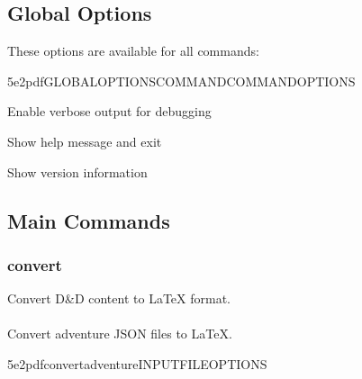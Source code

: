 \documentclass[letterpaper,10pt,english]{sphinxmanual}
\begin{document}
\subsection{Global Options}
\label{\detokenize{user-guide/cli-reference:global-options}}
\sphinxAtStartPar
These options are available for all commands:

\begin{sphinxVerbatim}[commandchars=\\\{\}]
5e2pdf\PYG{o}{[}GLOBAL\PYGZus{}OPTIONS\PYG{o}{]}COMMAND\PYG{o}{[}COMMAND\PYGZus{}OPTIONS\PYG{o}{]}
\end{sphinxVerbatim}
\begin{description}
\sphinxAtStartPar
Enable verbose output for debugging

\sphinxAtStartPar
Show help message and exit

\sphinxAtStartPar
Show version information

\end{description}


\subsection{Main Commands}
\label{\detokenize{user-guide/cli-reference:main-commands}}

\subsubsection{convert}
\label{\detokenize{user-guide/cli-reference:convert}}
\sphinxAtStartPar
Convert D\&D content to LaTeX format.

\sphinxAtStartPar
{}


\paragraph{}
\label{\detokenize{user-guide/cli-reference:adventure}}
\sphinxAtStartPar
Convert adventure JSON files to LaTeX.

\begin{sphinxVerbatim}[commandchars=\\\{\}]
5e2pdfconvertadventureINPUT\PYGZus{}FILE\PYG{o}{[}OPTIONS\PYG{o}{]}
\end{sphinxVerbatim}
\end{document}
